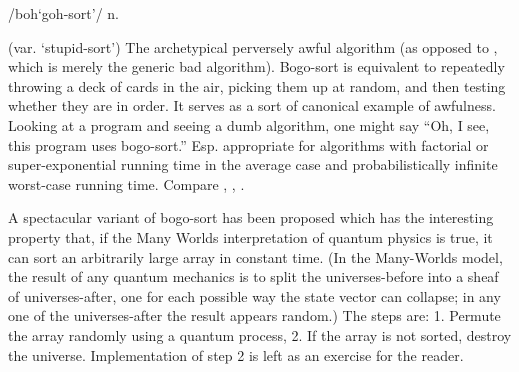  /boh`goh-sort'/ n.

(var. `stupid-sort') The archetypical perversely awful algorithm (as opposed to
, which is merely the generic bad algorithm). Bogo-sort
is equivalent to repeatedly throwing a deck of cards in the air, picking them up
at random, and then testing whether they are in order. It serves as a sort of
canonical example of awfulness. Looking at a program and seeing a dumb
algorithm, one might say ``Oh, I see, this program uses bogo-sort.'' Esp.
appropriate for algorithms with factorial or super-exponential running time in
the average case and probabilistically infinite worst-case running time. Compare
, , .

A spectacular variant of bogo-sort has been proposed which has the interesting
property that, if the Many Worlds interpretation of quantum physics is true, it
can sort an arbitrarily large array in constant time. (In the Many-Worlds model,
the result of any quantum mechanics is to split the universes-before into a
sheaf of universes-after, one for each possible way the state vector can
collapse; in any one of the universes-after the result appears random.) The
steps are: 1. Permute the array randomly using a quantum process, 2. If the
array is not sorted, destroy the universe. Implementation of step 2 is left as
an exercise for the reader.

